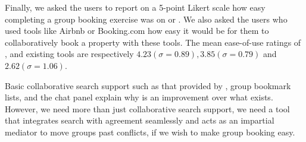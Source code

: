 Finally, we asked the users to report on a 5-point Likert scale how easy completing a group booking exercise was on \tool or \baseline. We also asked the users who used tools like Airbnb or Booking.com how easy it would be for them to collaboratively book a property with these tools. The mean ease-of-use ratings of \tool, \baseline and existing tools are respectively $4.23 (\sigma = 0.89), 3.85 (\sigma = 0.79)$ and $2.62 (\sigma = 1.06)$.

Basic collaborative search support such as that provided by \collabQueryPanel, group bookmark lists, and the chat panel explain why \baseline is an improvement over what exists. However, we need more than just collaborative search support, we need a tool that integrates search with agreement seamlessly and acts as an impartial mediator to move groups past conflicts, if we wish to make group booking easy.
